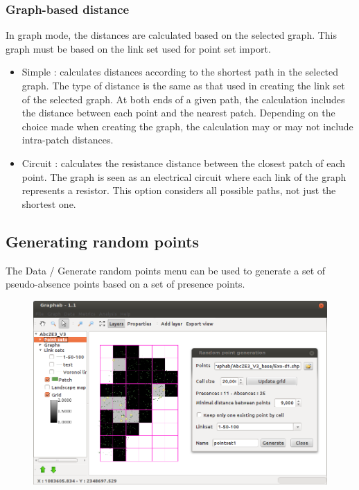 \documentclass{article}
\begin{document}
\subsubsection{Graph-based distance}
In graph mode, the distances are calculated based on the selected graph. This graph must be based on the link set used for point set import.
\begin{itemize}
	\item Simple : calculates distances according to the shortest path in the selected graph. The type of distance is the same as that used in creating the link set of the selected graph. At both ends of a given path, the calculation includes the distance between each point and the nearest patch. Depending on the choice made when creating the graph, the calculation may or may not include intra-patch distances.
	\item Circuit : calculates the resistance distance between the closest patch of each point. The graph is seen as an electrical circuit where each link of the graph represents a resistor. This option considers all possible paths, not just the shortest one.
\end{itemize}

\subsection{Generating random points}

The Data / Generate random points menu can be used to generate a set of pseudo-absence points based on a set of presence points.

\begin{figure}[H]
	\includegraphics[scale=0.5]{img/manual-en_img13.png}
\end{figure}
 
\end{document}
